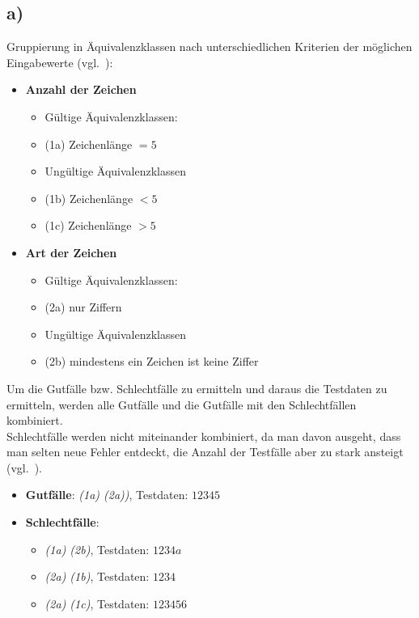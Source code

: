 \subsection*{a)}

Gruppierung in Äquivalenzklassen nach unterschiedlichen Kriterien der möglichen Eingabewerte (vgl.~\cite[44]{Wed09c}):

\begin{itemize}
    \item \textbf{Anzahl der Zeichen}
    \begin{itemize}
        \item Gültige Äquivalenzklassen:
        \item[] (1a) Zeichenlänge $=5$
        \item Ungültige Äquivalenzklassen
        \item[] (1b) Zeichenlänge $<5$
        \item[] (1c) Zeichenlänge $>5$
    \end{itemize}
    \item \textbf{Art der Zeichen}
    \begin{itemize}
        \item Gültige Äquivalenzklassen:
        \item[] (2a) nur Ziffern
        \item Ungültige Äquivalenzklassen
        \item[] (2b) mindestens ein Zeichen ist keine Ziffer
    \end{itemize}
\end{itemize}


\noindent
Um die Gutfälle bzw. Schlechtfälle zu ermitteln und daraus die Testdaten zu ermitteln, werden alle Gutfälle und die Gutfälle mit den Schlechtfällen kombiniert.\\
Schlechtfälle werden nicht miteinander kombiniert, da man davon ausgeht, dass man selten neue Fehler entdeckt, die Anzahl der Testfälle aber zu stark ansteigt (vgl.~\cite[44]{Wed09c}).

\begin{itemize}
    \item \textbf{Gutfälle}: \textit{(1a) (2a))}, Testdaten: $12345$
    \item \textbf{Schlechtfälle}:
    \begin{itemize}
        \item[] \textit{(1a) (2b)}, Testdaten: $1234a$
        \item[] \textit{(2a) (1b)}, Testdaten: $1234$
        \item[] \textit{(2a) (1c)}, Testdaten: $123456$
    \end{itemize}
\end{itemize}
